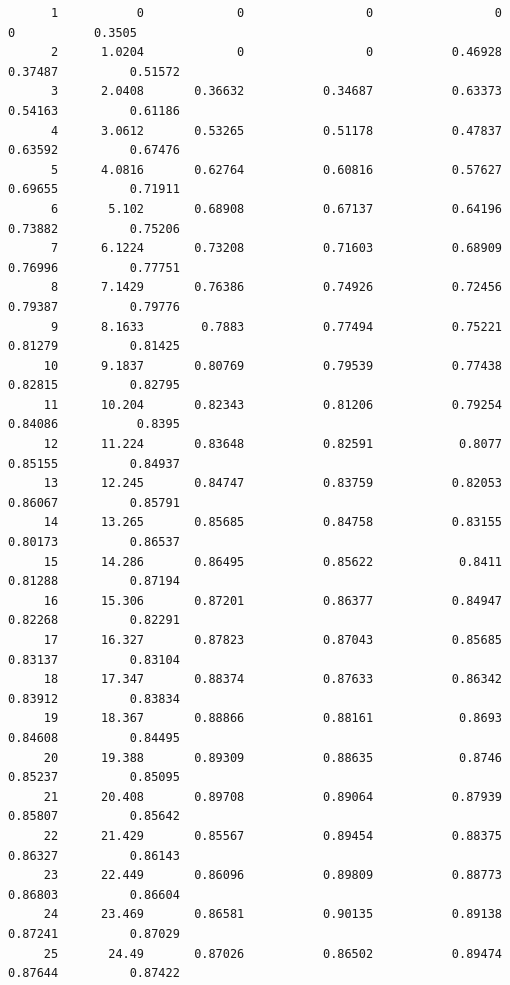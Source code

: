 \documentclass[
]{book}
\begin{document}
\begin{verbatim}
      1           0             0                 0                 0                 0           0.3505   
      2      1.0204             0                 0           0.46928           0.37487          0.51572   
      3      2.0408       0.36632           0.34687           0.63373           0.54163          0.61186   
      4      3.0612       0.53265           0.51178           0.47837           0.63592          0.67476   
      5      4.0816       0.62764           0.60816           0.57627           0.69655          0.71911   
      6       5.102       0.68908           0.67137           0.64196           0.73882          0.75206   
      7      6.1224       0.73208           0.71603           0.68909           0.76996          0.77751   
      8      7.1429       0.76386           0.74926           0.72456           0.79387          0.79776   
      9      8.1633        0.7883           0.77494           0.75221           0.81279          0.81425   
     10      9.1837       0.80769           0.79539           0.77438           0.82815          0.82795   
     11      10.204       0.82343           0.81206           0.79254           0.84086           0.8395   
     12      11.224       0.83648           0.82591            0.8077           0.85155          0.84937   
     13      12.245       0.84747           0.83759           0.82053           0.86067          0.85791   
     14      13.265       0.85685           0.84758           0.83155           0.80173          0.86537   
     15      14.286       0.86495           0.85622            0.8411           0.81288          0.87194   
     16      15.306       0.87201           0.86377           0.84947           0.82268          0.82291   
     17      16.327       0.87823           0.87043           0.85685           0.83137          0.83104   
     18      17.347       0.88374           0.87633           0.86342           0.83912          0.83834   
     19      18.367       0.88866           0.88161            0.8693           0.84608          0.84495   
     20      19.388       0.89309           0.88635            0.8746           0.85237          0.85095   
     21      20.408       0.89708           0.89064           0.87939           0.85807          0.85642   
     22      21.429       0.85567           0.89454           0.88375           0.86327          0.86143   
     23      22.449       0.86096           0.89809           0.88773           0.86803          0.86604   
     24      23.469       0.86581           0.90135           0.89138           0.87241          0.87029   
     25       24.49       0.87026           0.86502           0.89474           0.87644          0.87422   

\end{verbatim}
\end{document}
